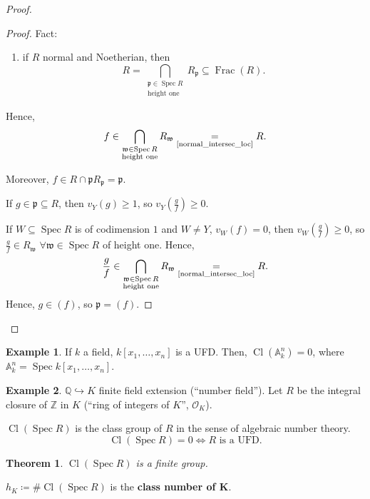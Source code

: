 \documentclass[12pt]{article}
\DeclareMathOperator{\Spec}{Spec}
\DeclareMathOperator{\Frac}{Frac}
\DeclareMathOperator{\Cl}{Cl}
\newtheorem*{theorem}{Theorem}
\theoremstyle{definition}
\newtheorem*{example}{Example}
\begin{document}
\begin{proof}
\begin{itemize}
\begin{proof}
Fact:
\begin{enumerate}[resume,label=(\roman*)]
\item\label{normal_intersec_loc} if $R$ normal and Noetherian, then
\[R=\bigcap_{\substack{\mathfrak p\in\Spec R\\\text{height one}}}R_\mathfrak p\subseteq\Frac(R).\]
\end{enumerate}

Hence,
\[f\in\bigcap_{\substack{\mathfrak w\in\Spec R\\\text{height one}}}R_\mathfrak w\underset{\text{\ref{normal_intersec_loc}}}=R.\]

Moreover, $f\in R\cap\mathfrak pR_\mathfrak p=\mathfrak p$.

If $g\in\mathfrak p\subseteq R$, then $v_Y(g)\geq1$, so $v_Y(\frac gf)\geq0$.

If $W\subseteq\Spec R$ is of codimension $1$ and $W\neq Y$, $v_W(f)=0$, then $v_W(\frac gf)\geq0$, so $\frac gf\in R_\mathfrak w$ $\forall\mathfrak w\in\Spec R$ of height one. Hence,
\[\frac gf\in\bigcap_{\substack{\mathfrak w\in\Spec R\\\text{height one}}}R_\mathfrak w\underset{\text{\ref{normal_intersec_loc}}}=R.\]
Hence, $g\in(f)$, so $\mathfrak p=(f)$.
\end{proof}
\end{itemize}
\end{proof}

\begin{example}
If $k$ a field, $k[x_1,\ldots,x_n]$ is a UFD. Then, $\Cl(\mathbb A_k^n)=0$, where $\mathbb A_k^n=\Spec k[x_1,\ldots,x_n]$.
\end{example}

\begin{example}
$\mathbb Q\hookrightarrow K$ finite field extension (``number field''). Let $R$ be the integral closure of $\mathbb Z$ in $K$ (``ring of integers of $K$'', $\mathcal O_K$).

$\Cl(\Spec R)$ is the class group of $R$ in the sense of algebraic number theory.
\[\Cl(\Spec R)=0\Longleftrightarrow R\text{ is a UFD}.\]

\begin{theorem}
$\Cl(\Spec R)$ is a finite group.
\end{theorem}

$h_K\coloneqq\#\Cl(\Spec R)$ is the \textbf{class number of $\boldsymbol K$}.
\end{example}
\end{document}
